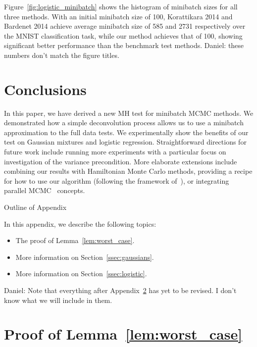 \documentclass{article}
\begin{document}
Figure~\ref{fig:logistic_minibatch} shows the histogram of minibatch sizes for
all three methods. With an initial minibatch size of 100, Korattikara 2014 and
Bardenet 2014 achieve average minibatch size of 585 and 2731 respectively over
the MNIST classification task, while our method achieves that of 100, showing
significant better performance than the benchmark test methods. {\color{blue}
Daniel: these numbers don't match the figure titles.}


\section{Conclusions}\label{sec:conclusion}

In this paper, we have derived a new MH test for minibatch MCMC methods. We demonstrated how a
simple deconvolution process allows us to use a minibatch approximation to the full data tests. We
experimentally show the benefits of our test on Gaussian mixtures and logistic regression.
Straightforward directions for future work include running more experiments with a
particular focus on investigation of the variance precondition.  More elaborate extensions include
combining our results with Hamiltonian Monte Carlo methods, providing a recipe for how to use our
algorithm (following the framework of~\cite{sgmcmc_2015}), or integrating parallel
MCMC~\cite{conf/uai/AngelinoKWSA14,conf/icml/AhnSW14} concepts.


\small


\normalsize

\clearpage
\appendix

\begin{center}
{\Large Outline of Appendix}
\end{center}

In this appendix, we describe the following topics:

\begin{itemize}[noitemsep]
    \item The proof of Lemma~\ref{lem:worst_case}.
    \item More information on Section~\ref{ssec:gaussians}.
    \item More information on Section~\ref{ssec:logistic}.
\end{itemize}

{\color{blue} Daniel: Note that everything after
Appendix~\ref{app:worst_case_proof} has yet to be revised. I don't know what we
will include in them.}

\section{Proof of Lemma~\ref{lem:worst_case}}\label{app:worst_case_proof}
\end{document}
